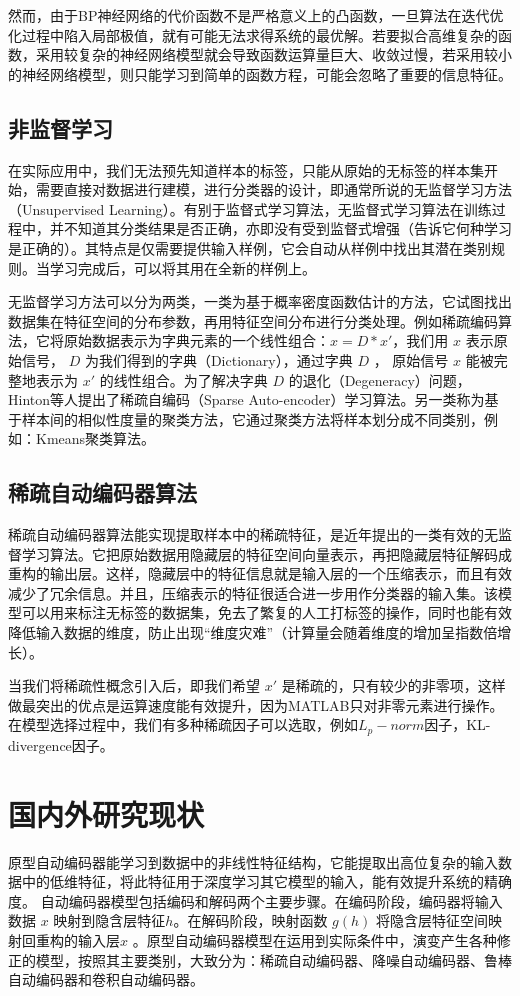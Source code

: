 \documentclass[oneside]{ZJUthesis}
\begin{document}
然而，由于BP神经网络的代价函数不是严格意义上的凸函数，一旦算法在迭代优化过程中陷入局部极值，就有可能无法求得系统的最优解。若要拟合高维复杂的函数，采用较复杂的神经网络模型就会导致函数运算量巨大、收敛过慢，若采用较小的神经网络模型，则只能学习到简单的函数方程，可能会忽略了重要的信息特征\cite{1}。


\subsection{非监督学习}
在实际应用中，我们无法预先知道样本的标签，只能从原始的无标签的样本集开始，需要直接对数据进行建模，进行分类器的设计，即通常所说的无监督学习方法（Unsupervised Learning）。有别于监督式学习算法，无监督式学习算法在训练过程中，并不知道其分类结果是否正确，亦即没有受到监督式增强（告诉它何种学习是正确的）。其特点是仅需要提供输入样例，它会自动从样例中找出其潜在类别规则。当学习完成后，可以将其用在全新的样例上。


无监督学习方法可以分为两类，一类为基于概率密度函数估计的方法，它试图找出数据集在特征空间的分布参数，再用特征空间分布进行分类处理。例如稀疏编码算法，它将原始数据表示为字典元素的一个线性组合：$x=D*x'$，我们用 $x$ 表示原始信号， $D$ 为我们得到的字典（Dictionary），通过字典 $D$ ， 原始信号 $x$ 能被完整地表示为 $x'$ 的线性组合。为了解决字典 $D$ 的退化（Degeneracy）问题，Hinton等人提出了稀疏自编码（Sparse Auto-encoder）学习算法。另一类称为基于样本间的相似性度量的聚类方法，它通过聚类方法将样本划分成不同类别，例如：Kmeans聚类算法。 

\subsection{稀疏自动编码器算法}
稀疏自动编码器算法能实现提取样本中的稀疏特征，是近年提出的一类有效的无监督学习算法。它把原始数据用隐藏层的特征空间向量表示，再把隐藏层特征解码成重构的输出层。这样，隐藏层中的特征信息就是输入层的一个压缩表示，而且有效减少了冗余信息。并且，压缩表示的特征很适合进一步用作分类器的输入集。该模型可以用来标注无标签的数据集，免去了繁复的人工打标签的操作，同时也能有效降低输入数据的维度，防止出现``维度灾难''（计算量会随着维度的增加呈指数倍增长）。

当我们将稀疏性概念引入后，即我们希望 $x'$ 是稀疏的，只有较少的非零项，这样做最突出的优点是运算速度能有效提升，因为MATLAB只对非零元素进行操作。在模型选择过程中，我们有多种稀疏因子可以选取，例如$L_p-norm$因子，KL-divergence因子。

\section{国内外研究现状}
原型自动编码器能学习到数据中的非线性特征结构，它能提取出高位复杂的输入数据中的低维特征，将此特征用于深度学习其它模型的输入，能有效提升系统的精确度\cite{16}。
自动编码器模型包括编码和解码两个主要步骤。在编码阶段，编码器将输入数据 $x$ 映射到隐含层特征$h$。在解码阶段，映射函数 $g(h)$ 将隐含层特征空间映射回重构的输入层$\hat x$ 。原型自动编码器模型在运用到实际条件中，演变产生各种修正的模型，按照其主要类别，大致分为：稀疏自动编码器、降噪自动编码器、鲁棒自动编码器和卷积自动编码器。
\end{document}
